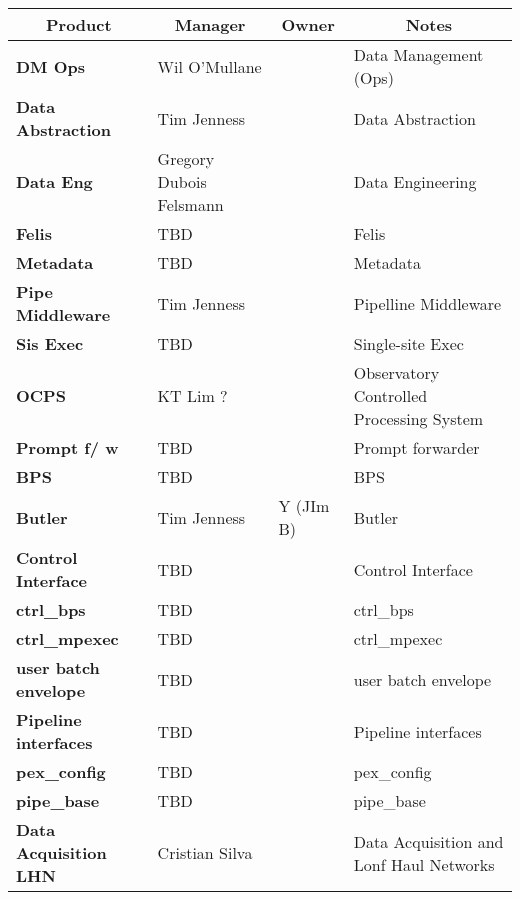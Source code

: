 

\scriptsize
\begin{longtable} {
|p{}   |p{}|p{} |p{}|}
\multicolumn{1}{c|}{\textbf{Product}} &
\multicolumn{1}{c|}{\textbf{Manager}} &
\multicolumn{1}{c|}{\textbf{Owner}} &
\multicolumn{1}{c}{\textbf{Notes}}|\\ \hline
{\textbf{DM Ops}} & Wil O'Mullane &  & Data Management (Ops) \\ \hline
{\textbf{Data Abstraction}} & Tim Jenness &  & Data Abstraction \\ \hline
{\textbf{Data Eng}} & Gregory Dubois Felsmann &  & Data Engineering \\ \hline
{\textbf{Felis}} & TBD &  & Felis \\ \hline
{\textbf{Metadata}} & TBD &  & Metadata \\ \hline
{\textbf{Pipe Middleware}} & Tim Jenness &  & Pipelline Middleware \\ \hline
{\textbf{Sis Exec}} & TBD &  & Single-site Exec \\ \hline
{\textbf{OCPS}} & KT Lim ? &  & Observatory Controlled Processing System \\ \hline
{\textbf{Prompt f/ w}} & TBD &  & Prompt forwarder \\ \hline
{\textbf{BPS}} & TBD &  & BPS \\ \hline
{\textbf{Butler}} & Tim Jenness & Y (JIm B) & Butler \\ \hline
{\textbf{Control Interface}} & TBD &  & Control Interface \\ \hline
{\textbf{ctrl\_bps}} & TBD &  & ctrl\_bps \\ \hline
{\textbf{ctrl\_mpexec}} & TBD &  & ctrl\_mpexec \\ \hline
{\textbf{user batch envelope}} & TBD &  & user batch envelope \\ \hline
{\textbf{Pipeline interfaces}} & TBD &  & Pipeline interfaces \\ \hline
{\textbf{pex\_config}} & TBD &  & pex\_config \\ \hline
{\textbf{pipe\_base}} & TBD &  & pipe\_base \\ \hline
{\textbf{Data Acquisition LHN}} & Cristian Silva &  & Data Acquisition and Lonf Haul Networks \\ \hline

\end{longtable}
